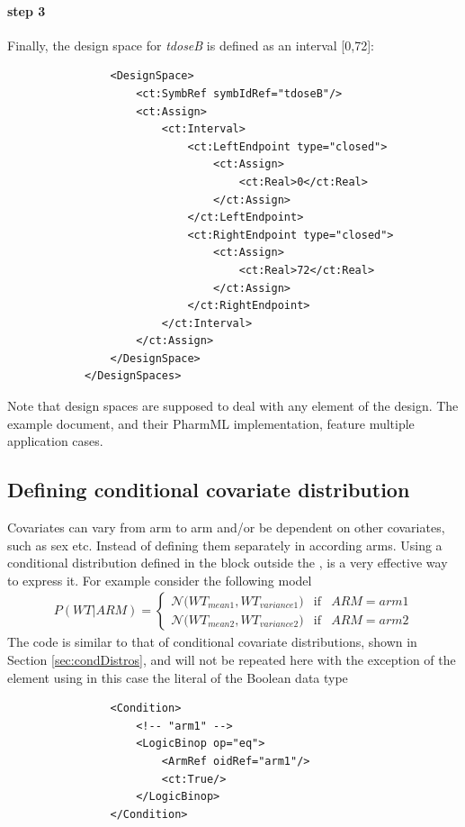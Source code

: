 \paragraph{step 3} Finally, the design space for \emph{tdoseB} is defined as 
an interval [0,72]:
\lstset{language=XML}
\begin{lstlisting}
                <DesignSpace>
                    <ct:SymbRef symbIdRef="tdoseB"/>
                    <ct:Assign>
                        <ct:Interval>
                            <ct:LeftEndpoint type="closed">
                                <ct:Assign>
                                    <ct:Real>0</ct:Real>
                                </ct:Assign>
                            </ct:LeftEndpoint>
                            <ct:RightEndpoint type="closed">
                                <ct:Assign>
                                    <ct:Real>72</ct:Real>
                                </ct:Assign>
                            </ct:RightEndpoint>
                        </ct:Interval>
                    </ct:Assign>
                </DesignSpace>
            </DesignSpaces>            
\end{lstlisting}
Note that design spaces are supposed to \marginpar{\HandCuffLeft} deal with 
any element of the design. The example document, \cite{CommetsExamples2015} and
their PharmML implementation, feature multiple application cases.


\subsection{Defining conditional covariate distribution}
\label{subsec:condDistrib}
Covariates can vary from arm to arm and/or be dependent 
on other covariates, such as sex etc.
Instead of defining them separately in according arms. Using a conditional 
distribution defined in the  block outside the ,
is a very effective way to express it. For example consider the following model
\begin{align}
P(WT|ARM) = 
\left\{ \begin{array}{rcl}     
\mathcal N \big(WT_{mean1}, WT_{variance1}\big) & \mbox{if} & ARM = arm1\\  
\mathcal N \big(WT_{mean2}, WT_{variance2}\big) & \mbox{if} & ARM = arm2 
\end{array}\right. \nonumber
\end{align}
The code is similar to that of conditional covariate distributions, 
shown in Section \ref{sec:condDistros}, and will not be repeated here with the 
exception of the  element using in this case the literal 
of the Boolean data type
\lstset{language=XML}
\begin{lstlisting}
                <Condition>
                    <!-- "arm1" -->
                    <LogicBinop op="eq">
                        <ArmRef oidRef="arm1"/>
                        <ct:True/>
                    </LogicBinop>
                </Condition>
\end{lstlisting}


